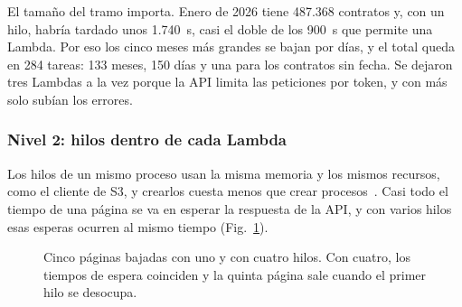 El tamaño del tramo importa. Enero de 2026 tiene 487.368 contratos y, con un hilo, habría tardado unos 1.740~s, casi el doble de los 900~s que permite una Lambda. Por eso los cinco meses más grandes se bajan por días, y el total queda en 284 tareas: 133 meses, 150 días y una para los contratos sin fecha. Se dejaron tres Lambdas a la vez porque la API limita las peticiones por token, y con más solo subían los errores.

\subsubsection{Nivel 2: hilos dentro de cada Lambda}
Los hilos de un mismo proceso usan la misma memoria y los mismos recursos, como el cliente de S3, y crearlos cuesta menos que crear procesos~\cite{grama2003}. Casi todo el tiempo de una página se va en esperar la respuesta de la API, y con varios hilos esas esperas ocurren al mismo tiempo (Fig.~\ref{cpd:fig:hilos}).

\begin{figure}[!htbp]
\centering



\caption{Cinco páginas bajadas con uno y con cuatro hilos. Con cuatro, los tiempos de espera coinciden y la quinta página sale cuando el primer hilo se desocupa.}
\label{cpd:fig:hilos}
\end{figure}

